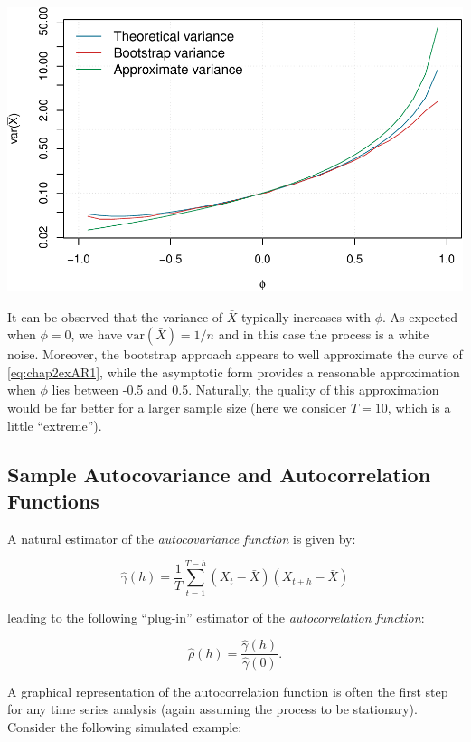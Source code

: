 \documentclass[]{book}
\theoremstyle{definition}
\theoremstyle{definition}
\theoremstyle{definition}
\theoremstyle{remark}
\begin{document}
\includegraphics{ts_files/figure-latex/estimXbar-1.pdf}

It can be observed that the variance of \(\bar{X}\) typically increases
with \(\phi\). As expected when \(\phi = 0\), we have
\(\text{var}(\bar{X}) = 1/n\) and in this case the process is a white
noise. Moreover, the bootstrap approach appears to well approximate the
curve of \eqref{eq:chap2exAR1}, while the asymptotic form provides a
reasonable approximation when \(\phi\) lies between -0.5 and 0.5.
Naturally, the quality of this approximation would be far better for a
larger sample size (here we consider \(T = 10\), which is a little
``extreme'').

\subsection{Sample Autocovariance and Autocorrelation
Functions}\label{sample-autocovariance-and-autocorrelation-functions}

A natural estimator of the \emph{autocovariance function} is given by:

\[\hat \gamma \left( h \right) = \frac{1}{T}\sum\limits_{t = 1}^{T - h} {\left( {{X_t} - \bar X} \right)\left( {{X_{t + h}} - \bar X} \right)} \]

leading to the following ``plug-in'' estimator of the
\emph{autocorrelation function}:

\[\hat \rho \left( h \right) = \frac{{\hat \gamma \left( h \right)}}{{\hat \gamma \left( 0 \right)}}.\]

A graphical representation of the autocorrelation function is often the
first step for any time series analysis (again assuming the process to
be stationary). Consider the following simulated example:
\end{document}
